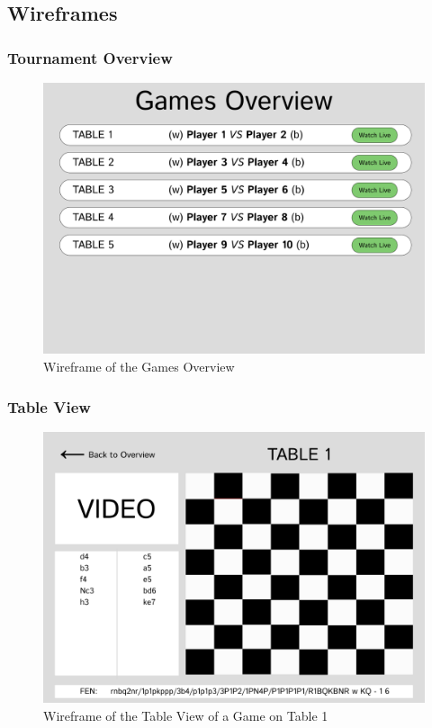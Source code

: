 \subsection{Wireframes}
\label{subsec:wireframe}

\subsubsection*{Tournament Overview}
\label{subsubsec:tournament-overview}

\begin{figure}[h!]
    \centering
    \includegraphics[width=0.75\linewidth]{figures/wireframe/overview.png}
    \caption[Games Overview Wireframe]{Wireframe of the Games Overview}
    \label{fig:app-overview}
\end{figure}

\subsubsection*{Table View}
\label{subsubsec:table-view}

\begin{figure}[h!]
    \centering
    \includegraphics[width=0.75\linewidth]{figures/wireframe/table-view.png}
    \caption[Table View Wireframe]{Wireframe of the Table View of a Game on Table 1}
    \label{fig:app-table-view}
\end{figure}

